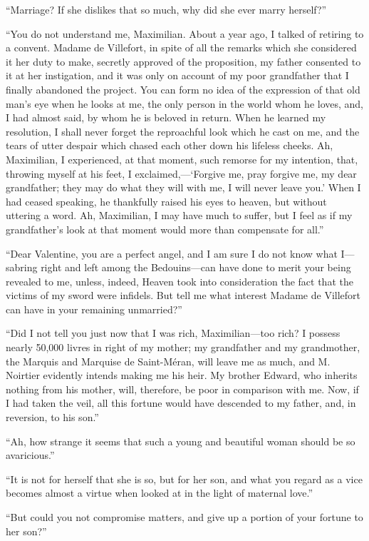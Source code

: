 “Marriage? If she dislikes that so much, why did she ever marry
herself?”

“You do not understand me, Maximilian. About a year ago, I talked of
retiring to a convent. Madame de Villefort, in spite of all the remarks
which she considered it her duty to make, secretly approved of the
proposition, my father consented to it at her instigation, and it was
only on account of my poor grandfather that I finally abandoned the
project. You can form no idea of the expression of that old man’s eye
when he looks at me, the only person in the world whom he loves, and, I
had almost said, by whom he is beloved in return. When he learned my
resolution, I shall never forget the reproachful look which he cast on
me, and the tears of utter despair which chased each other down his
lifeless cheeks. Ah, Maximilian, I experienced, at that moment, such
remorse for my intention, that, throwing myself at his feet, I
exclaimed,—‘Forgive me, pray forgive me, my dear grandfather; they may
do what they will with me, I will never leave you.’ When I had ceased
speaking, he thankfully raised his eyes to heaven, but without uttering
a word. Ah, Maximilian, I may have much to suffer, but I feel as if my
grandfather’s look at that moment would more than compensate for all.”

“Dear Valentine, you are a perfect angel, and I am sure I do not know
what I—sabring right and left among the Bedouins—can have done to merit
your being revealed to me, unless, indeed, Heaven took into
consideration the fact that the victims of my sword were infidels. But
tell me what interest Madame de Villefort can have in your remaining
unmarried?”

“Did I not tell you just now that I was rich, Maximilian—too rich? I
possess nearly 50,000 livres in right of my mother; my grandfather and
my grandmother, the Marquis and Marquise de Saint-Méran, will leave me
as much, and M. Noirtier evidently intends making me his heir. My
brother Edward, who inherits nothing from his mother, will, therefore,
be poor in comparison with me. Now, if I had taken the veil, all this
fortune would have descended to my father, and, in reversion, to his
son.”

“Ah, how strange it seems that such a young and beautiful woman should
be so avaricious.”

“It is not for herself that she is so, but for her son, and what you
regard as a vice becomes almost a virtue when looked at in the light of
maternal love.”

“But could you not compromise matters, and give up a portion of your
fortune to her son?”

